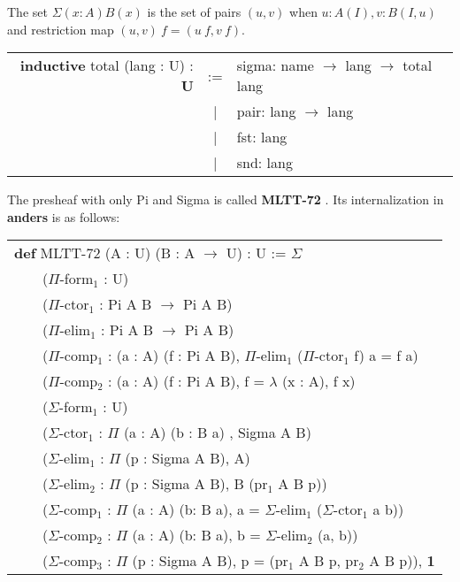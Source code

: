 \documentclass[a4paper,UKenglish,cleveref, autoref, thm-restate]{lipics-v2021}
\newcommand{\tabstyle}[0]{\scriptsize\ttfamily\fontseries{l}\selectfont}
\begin{document}
\begin{definition}[Sigma]
The set $\Sigma(x:A)B(x)$ is the set of pairs $(u,v)$ when $u:A(I),v:B(I,u)$ and restriction map $(u,v)\ f=(u\ f,v\ f)$.
\end{definition}
\begin{table}[ht]
\tabstyle
\begin{tabular}{rcl}
  \textbf{inductive} total (lang : U) : \textbf{U}& := & sigma: name $\rightarrow$ lang $\rightarrow$ total lang \\
  &|& pair: lang $\rightarrow$ lang \\
  &|& fst: lang \\
  &|& snd: lang \\
\end{tabular}
\end{table}

The presheaf with only Pi and Sigma is called \textbf{MLTT-72} \cite{MLTT72}. Its internalization in \textbf{anders} is as follows:

\begin{table}[ht!]
\tabstyle
\begin{tabular}{l}
\textbf{def} MLTT-72 (A : U) (B : A $\rightarrow$ U) : U := $\Sigma$ \\
\ \ \ \ ($\Pi$-form$_1$ : U) \\
\ \ \ \ ($\Pi$-ctor$_1$ : Pi A B $\rightarrow$ Pi A B) \\
\ \ \ \ ($\Pi$-elim$_1$ : Pi A B $\rightarrow$ Pi A B) \\
\ \ \ \ ($\Pi$-comp$_1$ : (a : A) (f : Pi A B), $\Pi$-elim$_1$ ($\Pi$-ctor$_1$ f) a = f a) \\
\ \ \ \ ($\Pi$-comp$_2$ : (a : A) (f : Pi A B), f = $\lambda$ (x : A), f x) \\
\ \ \ \ ($\Sigma$-form$_1$ : U) \\
\ \ \ \ ($\Sigma$-ctor$_1$ : $\Pi$ (a : A) (b : B a) , Sigma A B) \\
\ \ \ \ ($\Sigma$-elim$_1$ : $\Pi$ (p : Sigma A B), A) \\
\ \ \ \ ($\Sigma$-elim$_2$ : $\Pi$ (p : Sigma A B), B (pr$_1$ A B p)) \\
\ \ \ \ ($\Sigma$-comp$_1$ : $\Pi$ (a : A) (b: B a), a = $\Sigma$-elim$_1$ ($\Sigma$-ctor$_1$ a b)) \\
\ \ \ \ ($\Sigma$-comp$_2$ : $\Pi$ (a : A) (b: B a), b = $\Sigma$-elim$_2$ (a, b)) \\
\ \ \ \ ($\Sigma$-comp$_3$ : $\Pi$ (p : Sigma A B), p = (pr$_1$ A B p, pr$_2$ A B p)), \textbf{1}
\end{tabular}
\end{table}
\end{document}
